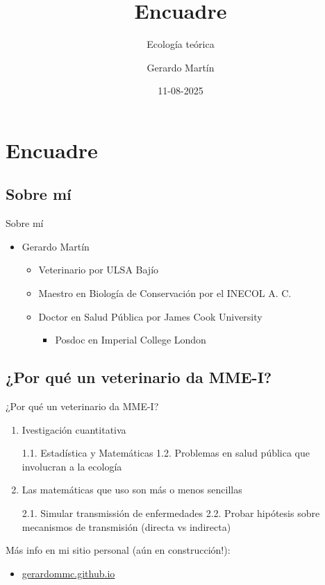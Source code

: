 \documentclass[
  11pt,
  ignorenonframetext,
]{beamer}
\title{Encuadre}
\subtitle{Ecología teórica}
\author{Gerardo Martín}
\date{11-08-2025}
\providecommand{\tightlist}{%
  \setlength{\itemsep}{0pt}\setlength{\parskip}{0pt}}
\begin{document}
\frame{\titlepage}

\section{Encuadre}\label{encuadre}

\subsection{Sobre mí}\label{sobre-muxed}

\begin{frame}{Sobre mí}
\begin{itemize}
\item
  Gerardo Martín

  \begin{itemize}
  \tightlist
  \item
    Veterinario por ULSA Bajío
  \item
    Maestro en Biología de Conservación por el INECOL A. C.
  \item
    Doctor en Salud Pública por James Cook University

    \begin{itemize}
    \tightlist
    \item
      Posdoc en Imperial College London
    \end{itemize}
  \end{itemize}
\end{itemize}
\end{frame}

\subsection{¿Por qué un veterinario da
MME-I?}\label{por-quuxe9-un-veterinario-da-mme-i}

\begin{frame}{¿Por qué un veterinario da MME-I?}
\begin{enumerate}
\item
  Ivestigación cuantitativa

  1.1. Estadística y Matemáticas 1.2. Problemas en salud pública que
  involucran a la ecología
\item
  Las matemáticas que uso son más o menos sencillas

  2.1. Simular transmissión de enfermedades 2.2. Probar hipótesis sobre
  mecanismos de transmisión (directa vs indirecta)
\end{enumerate}

Más info en mi sitio personal (aún en construcción!):

\begin{itemize}
\tightlist
\item
  \href{https://gerardommc.gihub.io}{gerardommc.github.io}
\end{itemize}
\end{frame}
\end{document}
